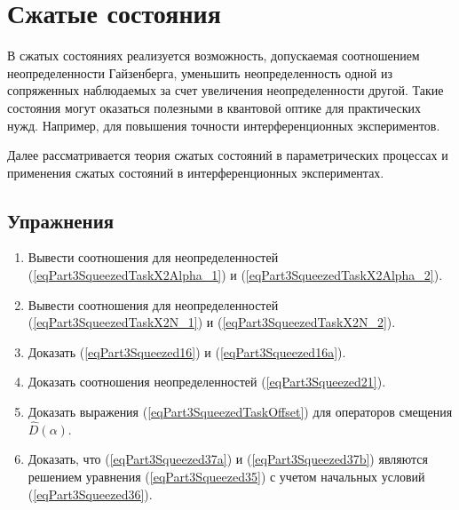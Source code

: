\chapter{Сжатые состояния}
\label{ChSqueezed}
В сжатых состояниях реализуется возможность, допускаемая соотношением
неопределенности Гайзенберга, уменьшить неопределенность одной из
сопряженных наблюдаемых за счет увеличения неопределенности другой.
Такие состояния могут оказаться полезными в квантовой оптике для
практических нужд. Например, для повышения точности интерференционных
экспериментов. 

Далее рассматривается теория сжатых состояний в параметрических
процессах и применения сжатых состояний в интерференционных
экспериментах. 









\section{Упражнения}
\begin{enumerate}
\item Вывести соотношения для неопределенностей
  (\ref{eqPart3SqueezedTaskX2Alpha_1}) и
  (\ref{eqPart3SqueezedTaskX2Alpha_2}).
\item Вывести соотношения для неопределенностей
  (\ref{eqPart3SqueezedTaskX2N_1}) и
  (\ref{eqPart3SqueezedTaskX2N_2}).
\item Доказать (\ref{eqPart3Squeezed16}) и
  (\ref{eqPart3Squeezed16a}). 
\item Доказать соотношения неопределенностей
  (\ref{eqPart3Squeezed21}). 
\item Доказать выражения (\ref{eqPart3SqueezedTaskOffset}) для
  операторов смещения $\hat{D}\left(\alpha\right)$.
\item Доказать, что (\ref{eqPart3Squeezed37a}) и
  (\ref{eqPart3Squeezed37b}) являются решением 
  уравнения (\ref{eqPart3Squeezed35}) с учетом начальных
  условий (\ref{eqPart3Squeezed36}).
\end{enumerate}
